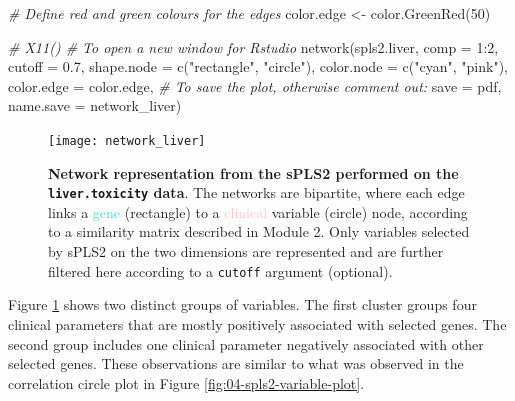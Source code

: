 \documentclass[
]{book}
\newenvironment{Shaded}{\begin{snugshade}}{\end{snugshade}}
\newcommand{\AttributeTok}[1]{\textcolor[rgb]{0.77,0.63,0.00}{#1}}
\newcommand{\CommentTok}[1]{\textcolor[rgb]{0.56,0.35,0.01}{\textit{#1}}}
\newcommand{\DecValTok}[1]{\textcolor[rgb]{0.00,0.00,0.81}{#1}}
\newcommand{\FloatTok}[1]{\textcolor[rgb]{0.00,0.00,0.81}{#1}}
\newcommand{\FunctionTok}[1]{\textcolor[rgb]{0.00,0.00,0.00}{#1}}
\newcommand{\NormalTok}[1]{#1}
\newcommand{\OtherTok}[1]{\textcolor[rgb]{0.56,0.35,0.01}{#1}}
\newcommand{\SpecialCharTok}[1]{\textcolor[rgb]{0.00,0.00,0.00}{#1}}
\newcommand{\StringTok}[1]{\textcolor[rgb]{0.31,0.60,0.02}{#1}}
\begin{document}
\begin{Shaded}
\begin{Highlighting}[]
\CommentTok{\# Define red and green colours for the edges}
\NormalTok{color.edge }\OtherTok{\textless{}{-}} \FunctionTok{color.GreenRed}\NormalTok{(}\DecValTok{50}\NormalTok{)}

\CommentTok{\# X11()  \# To open a new window for Rstudio}
\FunctionTok{network}\NormalTok{(spls2.liver, }\AttributeTok{comp =} \DecValTok{1}\SpecialCharTok{:}\DecValTok{2}\NormalTok{,}
        \AttributeTok{cutoff =} \FloatTok{0.7}\NormalTok{,}
        \AttributeTok{shape.node =} \FunctionTok{c}\NormalTok{(}\StringTok{"rectangle"}\NormalTok{, }\StringTok{"circle"}\NormalTok{),}
        \AttributeTok{color.node =} \FunctionTok{c}\NormalTok{(}\StringTok{"cyan"}\NormalTok{, }\StringTok{"pink"}\NormalTok{),}
        \AttributeTok{color.edge =}\NormalTok{ color.edge,}
        \CommentTok{\# To save the plot, otherwise comment out:}
        \AttributeTok{save =} \StringTok{\textquotesingle{}pdf\textquotesingle{}}\NormalTok{, }\AttributeTok{name.save =} \StringTok{\textquotesingle{}network\_liver\textquotesingle{}}\NormalTok{)}
\end{Highlighting}
\end{Shaded}

\begin{figure}

{\centering \texttt{[image: network\_liver]} 

}

\caption{\textbf{Network representation from the sPLS2 performed on the \texttt{liver.toxicity} data}. The networks are bipartite, where each edge links a \textcolor{turquoise}{gene} (rectangle) to a \textcolor{pink}{clinical} variable (circle) node, according to a similarity matrix described in Module 2. Only variables selected by sPLS2 on the two dimensions are represented and are further filtered here according to a \texttt{cutoff} argument (optional).}\label{fig:04-spls2-network2}
\end{figure}



Figure \ref{fig:04-spls2-network2} shows two distinct groups of variables. The first cluster groups four clinical parameters that are mostly positively associated with selected genes. The second group includes one clinical parameter negatively associated with other selected genes. These observations are similar to what was observed in the correlation circle plot in Figure \ref{fig:04-spls2-variable-plot}.
\end{document}

